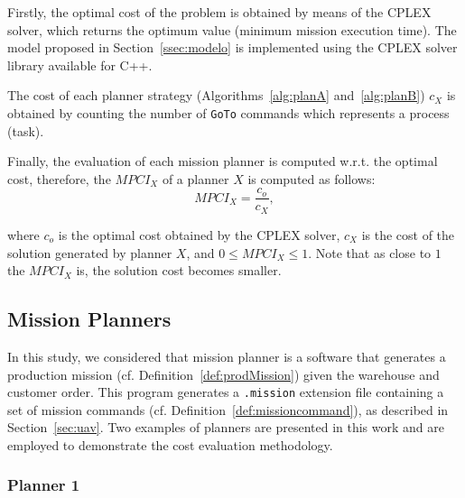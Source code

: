 \documentclass[conference]{IEEEtran}
\begin{document}
Firstly, the optimal cost of the problem is obtained by means of the CPLEX solver, which returns the optimum value (minimum mission execution time). The model proposed in Section~\ref{ssec:modelo} is implemented using the CPLEX solver library available for C++. 

The cost of each planner strategy (Algorithms~\ref{alg:planA} and~\ref{alg:planB}) $c_X$ is obtained by counting the number of \texttt{GoTo} commands which represents a process (task).

Finally, the evaluation of each mission planner is computed w.r.t. the optimal cost, therefore, the $MPCI_{X}$ of a planner $X$ is computed as follows:
%
\begin{equation}
\label{eq:MPCI}
	MPCI_X=\frac{c_o}{c_X},
\end{equation}

\noindent where $c_o$ is the optimal cost obtained by the CPLEX solver, \textbf{$c_X$} is the cost of the solution generated by planner $X$, and $0 \leq MPCI_X \leq 1$. Note that as close to $1$ the $MPCI_X$ is, the solution cost becomes smaller.

\subsection{Mission Planners}

In this study, we considered that mission planner is a software that generates a production mission (cf. Definition~\ref{def:prodMission}) given the warehouse and customer order. This program generates a \texttt{.mission} extension file containing a set of mission commands (cf. Definition~\ref{def:missioncommand}), as described in Section~\ref{sec:uav}. Two examples of planners are presented in this work and are employed to demonstrate the cost evaluation methodology.

\subsubsection{Planner 1}
\end{document}
